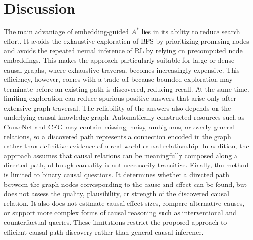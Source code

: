 \chapter{Discussion}
\label{chap:discussion}

The main advantage of embedding-guided $A^*$ lies in its ability to reduce search effort. It avoids the exhaustive exploration of BFS by prioritizing promising nodes and avoids the repeated neural inference of RL by relying on precomputed node embeddings. This makes the approach particularly suitable for large or dense causal graphs, where exhaustive traversal becomes increasingly expensive. This efficiency, however, comes with a trade-off because bounded exploration may terminate before an existing path is discovered, reducing recall. At the same time, limiting exploration can reduce spurious positive answers that arise only after extensive graph traversal. The reliability of the answers also depends on the underlying causal knowledge graph. Automatically constructed resources such as CauseNet and CEG may contain missing, noisy, ambiguous, or overly general relations, so a discovered path represents a connection encoded in the graph rather than definitive evidence of a real-world causal relationship. In addition, the approach assumes that causal relations can be meaningfully composed along a directed path, although causality is not necessarily transitive. Finally, the method is limited to binary causal questions. It determines whether a directed path between the graph nodes corresponding to the cause and effect can be found, but does not assess the quality, plausibility, or strength of the discovered causal relation. It also does not estimate causal effect sizes, compare alternative causes, or support more complex forms of causal reasoning such as interventional and counterfactual queries. These limitations restrict the proposed approach to efficient causal path discovery rather than general causal inference.

